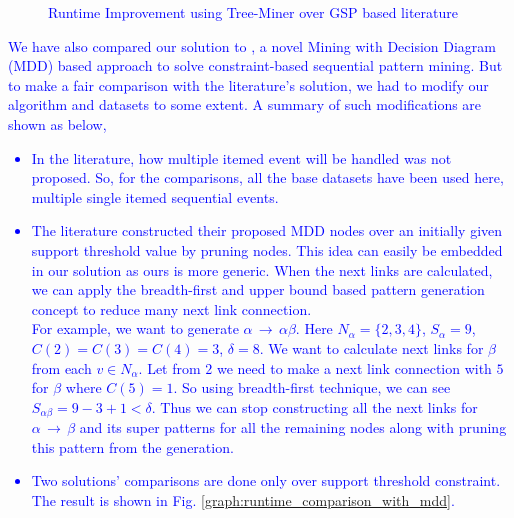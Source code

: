 \begin{figure*}[!tb]
\begin{subfigure}{.24\linewidth}
\begin{adjustbox}{max width=\textwidth}
        \end{adjustbox}
        \caption{}
        \end{subfigure}
        \caption{\textcolor{blue}{Runtime Improvement using Tree-Miner over GSP based literature}}
        \label{figure:runtime_with_gsp}
        \end{figure*}

\textcolor{blue}{We have also compared our solution to \cite{hosseininasab2019constraint}, a novel Mining with Decision Diagram (MDD) based approach to solve constraint-based sequential pattern mining. But to make a fair comparison with the literature's solution, we had to modify our algorithm and datasets to some extent. A summary of such modifications are shown as below,} 

\textcolor{blue}{\begin{itemize}
    \item In the literature, how multiple itemed event will be handled was not proposed. So, for the comparisons, all the base datasets have been used here, multiple single itemed  sequential events.  
    \item The literature constructed their proposed MDD nodes over an initially given support threshold value by pruning nodes. This idea can easily be embedded in our solution as ours is more generic. When the next links are calculated, we can apply the breadth-first and upper bound based pattern generation concept to reduce many next link connection.\\ 
    For example, we want to generate $\alpha \,\to\, \alpha\beta$. Here $N_{\alpha}=\{2, 3, 4\}$, $S_{\alpha}=9$, $C(2)=C(3)=C(4)=3$, $\delta=8$. We want to calculate next links for $\beta$ from each $v\in N_{\alpha}$. Let from $2$ we need to make a next link connection with $5$ for $\beta$ where $C(5)=1$. So using breadth-first technique, we can see $S_{\alpha\beta}=9-3+1<\delta$. Thus we can stop constructing all the next links for $\alpha \,\to \, \beta$ and its super patterns for all the remaining nodes along with pruning this pattern from the generation. 
    \item Two solutions' comparisons are done only over support threshold constraint. The result is shown in Fig. \ref{graph:runtime_comparison_with_mdd}. 
\end{itemize}}

